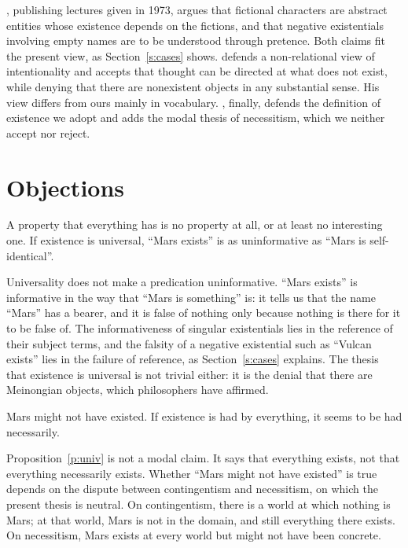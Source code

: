 \documentclass{situationist-preprint}
\begin{document}
\citet{Kripke2013}, publishing lectures given in 1973, argues that fictional characters are abstract entities whose existence depends on the fictions, and that negative existentials involving empty names are to be understood through pretence. Both claims fit the present view, as Section~\ref{s:cases} shows. \citet{Crane2013} defends a non-relational view of intentionality and accepts that thought can be directed at what does not exist, while denying that there are nonexistent objects in any substantial sense. His view differs from ours mainly in vocabulary. \citet{Williamson2013}, finally, defends the definition of existence we adopt and adds the modal thesis of necessitism, which we neither accept nor reject.

\section{Objections}\label{s:obj}

\begin{objection}[Triviality]
A property that everything has is no property at all, or at least no interesting one. If existence is universal, \enquote{Mars exists} is as uninformative as \enquote{Mars is self-identical}.
\end{objection}

\begin{reply}
Universality does not make a predication uninformative. \enquote{Mars exists} is informative in the way that \enquote{Mars is something} is: it tells us that the name \enquote{Mars} has a bearer, and it is false of nothing only because nothing is there for it to be false of. The informativeness of singular existentials lies in the reference of their subject terms, and the falsity of a negative existential such as \enquote{Vulcan exists} lies in the failure of reference, as Section~\ref{s:cases} explains. The thesis that existence is universal is not trivial either: it is the denial that there are Meinongian objects, which philosophers have affirmed.
\end{reply}

\begin{objection}[Contingency]
Mars might not have existed. If existence is had by everything, it seems to be had necessarily.
\end{objection}

\begin{reply}
Proposition~\ref{p:univ} is not a modal claim. It says that everything exists, not that everything necessarily exists. Whether \enquote{Mars might not have existed} is true depends on the dispute between contingentism and necessitism, on which the present thesis is neutral. On contingentism, there is a world at which nothing is Mars; at that world, Mars is not in the domain, and still everything there exists. On necessitism, Mars exists at every world but might not have been concrete.
\end{reply}
\end{document}
